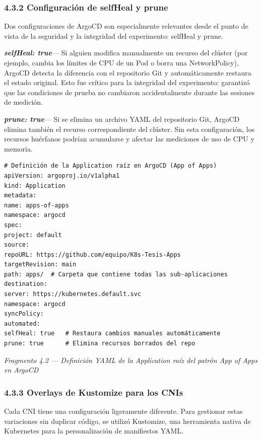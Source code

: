 \documentclass[journal]{IEEEtran}
\begin{document}
\subsubsection{4.3.2 Configuración de selfHeal y prune}

Dos configuraciones de ArgoCD son especialmente relevantes desde el punto de vista de la seguridad y la integridad del experimento: selfHeal y prune.

\textbf{\emph{selfHeal: true}}--- Si alguien modifica manualmente un recurso del clúster (por ejemplo, cambia los límites de CPU de un Pod o borra una NetworkPolicy), ArgoCD detecta la diferencia con el repositorio Git y automáticamente restaura el estado original. Esto fue crítico para la integridad del experimento: garantizó que las condiciones de prueba no cambiaron accidentalmente durante las sesiones de medición.

\textbf{\emph{prune: true}}--- Si se elimina un archivo YAML del repositorio Git, ArgoCD elimina también el recurso correspondiente del clúster. Sin esta configuración, los recursos huérfanos podrían acumularse y afectar las mediciones de uso de CPU y memoria.

\begin{lstlisting}[basicstyle=\ttfamily\scriptsize,breaklines=true]
# Definición de la Application raíz en ArgoCD (App of Apps)
apiVersion: argoproj.io/v1alpha1
kind: Application
metadata:
name: apps-of-apps
namespace: argocd
spec:
project: default
source:
repoURL: https://github.com/equipo/K8s-Tesis-Apps
targetRevision: main
path: apps/  # Carpeta que contiene todas las sub-aplicaciones
destination:
server: https://kubernetes.default.svc
namespace: argocd
syncPolicy:
automated:
selfHeal: true   # Restaura cambios manuales automáticamente
prune: true      # Elimina recursos borrados del repo
\end{lstlisting}

\begin{center}\emph{\emph{Fragmento 4.2 --- Definición YAML de la Application raíz del patrón App of Apps en ArgoCD}}\end{center}

\subsubsection{4.3.3 Overlays de Kustomize para los CNIs}

Cada CNI tiene una configuración ligeramente diferente. Para gestionar estas variaciones sin duplicar código, se utilizó Kustomize, una herramienta nativa de Kubernetes para la personalización de manifiestos YAML.
\end{document}
